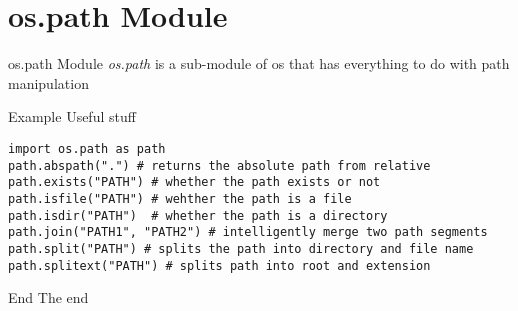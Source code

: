\section{os.path Module}

\begin{frame}[containsverbatim]{os.path Module}
  \textit{os.path} is a sub-module of os that has everything to do with path manipulation
\end{frame}

\begin{frame}[containsverbatim]{Example Useful stuff}
\begin{verbatim}
import os.path as path
path.abspath(".") # returns the absolute path from relative
path.exists("PATH") # whether the path exists or not
path.isfile("PATH") # wehther the path is a file
path.isdir("PATH")  # whether the path is a directory
path.join("PATH1", "PATH2") # intelligently merge two path segments
path.split("PATH") # splits the path into directory and file name
path.splitext("PATH") # splits path into root and extension
\end{verbatim}
\end{frame}

\begin{frame}[standout]{End}
  The end
\end{frame}


